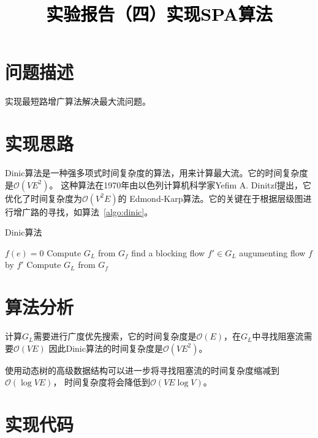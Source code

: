 \documentclass[a4paper,twoside]{article}
\newcommand{\PaperTitle}{实验报告（四）实现SPA算法}  %
\begin{document}
\newpage

\title{
	\Large{\textcolor{black}{\PaperTitle}}
}
	
	
\maketitle
	
\tableofcontents
 
\newpage
\begin{spacing}{1.2}

\section{问题描述}

实现最短路增广算法解决最大流问题。

\section{实现思路}

Dinic算法是一种强多项式时间复杂度的算法，用来计算最大流。它的时间复杂度是$\mathcal{O}(VE^2)$。
这种算法在1970年由以色列计算机科学家Yefim A. Dinitzf提出，它优化了时间复杂度为$\mathcal{O}(V^2E)$的
Edmond-Karp算法。它的关键在于根据层级图进行增广路的寻找，如算法~\ref{algo:dinic}。

\begin{algorithm}[htbp]
	\caption{Dinic算法}
	\label{algo:dinic}
	\begin{algorithmic}[1]
				\State $f(e)=0$
			\EndFor
			\State Compute $G_L$ from $G_f$
				\State find a blocking flow $f'\in G_L$
				\State augumenting flow $f$ by $f'$
				\State Compute $G_L$ from $G_f$
			\EndWhile
		\EndProcedure
	\end{algorithmic}
\end{algorithm}	

\section{算法分析}

计算$G_L$需要进行广度优先搜索，它的时间复杂度是$\mathcal{O}(E)$，在$G_L$中寻找阻塞流需要$\mathcal{O}(VE)$
因此Dinic算法的时间复杂度是$\mathcal{O}(VE^2)$。

使用动态树的高级数据结构可以进一步将寻找阻塞流的时间复杂度缩减到$\mathcal{O}(\log VE)$，
时间复杂度将会降低到$\mathcal{O}(VE\log V)$。
\section{实现代码}


\end{spacing}
\end{document}
